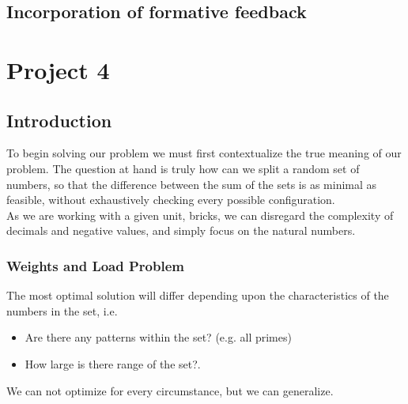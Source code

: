 \documentclass[a4paper]{article}
\begin{document}
\newpage


\subsection{Incorporation of formative feedback}


\newpage



\section{Project 4}
\subsection{Introduction}
To begin solving our problem we must first contextualize the true meaning of our problem.
The question at hand is truly how can we split a random set of numbers,
so that the difference between the sum of the sets is as minimal as feasible, 
without exhaustively checking every possible configuration. \\

As we are working with a given unit, bricks, we can disregard the complexity of decimals and negative values,
and simply focus on the natural numbers.

\subsubsection{Weights and Load Problem}
The most optimal solution will differ depending upon the characteristics of the numbers in the set,
i.e. 

\begin{itemize}
  \item Are there any patterns within the set? (e.g. all primes)
  \item How large is there range of the set?.

\end{itemize}
\vspace{4mm}

We can not optimize for every circumstance, 
but we can generalize. \\
\vspace{4mm}
\end{document}
